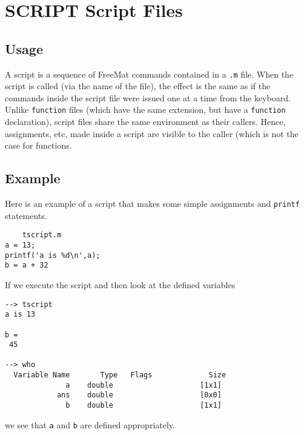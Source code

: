 \section{SCRIPT Script Files}

\subsection{Usage}

A script is a sequence of FreeMat commands contained in a
\verb|.m| file.  When the script is called (via the name of the
file), the effect is the same as if the commands inside the
script file were issued one at a time from the keyboard.
Unlike \verb|function| files (which have the same extension,
but have a \verb|function| declaration), script files share
the same environment as their callers.  Hence, assignments,
etc, made inside a script are visible to the caller (which
is not the case for functions.
\subsection{Example}

Here is an example of a script that makes some simple
assignments and \verb|printf| statements.
\begin{verbatim}
    tscript.m
a = 13;
printf('a is %d\n',a);
b = a + 32
\end{verbatim}
If we execute the script and then look at the defined variables
\begin{verbatim}
--> tscript
a is 13

b = 
 45 

--> who
  Variable Name       Type   Flags             Size
              a    double                    [1x1]
            ans    double                    [0x0]
              b    double                    [1x1]
\end{verbatim}
we see that \verb|a| and \verb|b| are defined appropriately.
